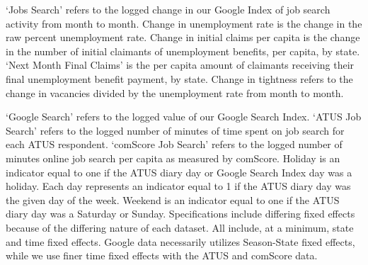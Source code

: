\documentclass[11pt, final]{article}
\begin{document}
\begin{sidewaystable}
\begin{center}

\end{center}
\begin{tablenotes}
\item \footnotesize  `Jobs Search' refers to the logged change in our Google Index of job search activity from month to month. Change in unemployment rate is the change in the raw percent unemployment rate. Change in initial claims per capita is the change in the number of initial claimants of unemployment benefits, per capita, by state. `Next Month Final Claims' is the per capita amount of claimants receiving their final unemployment benefit payment, by state. Change in tightness refers to the change in vacancies divided by the unemployment rate from month to month.
\end{tablenotes}
\end{sidewaystable}

\begin{sidewaystable}
\begin{center}

\end{center}
\begin{tablenotes}
\item \footnotesize `Google Search' refers to the logged value of our Google Search Index. `ATUS Job Search' refers to the logged number of minutes of time spent on job search for each ATUS respondent. `comScore Job Search' refers to the logged number of minutes online job search per capita as measured by comScore. Holiday is an indicator equal to one if the ATUS diary day or Google Search Index day was a holiday. Each day represents an indicator equal to 1 if the ATUS diary day was the given day of the week. Weekend is an indicator equal to one if the ATUS diary day was a Saturday or Sunday. Specifications include differing fixed effects because of the differing nature of each dataset. All include, at a minimum, state and time fixed effects. Google data necessarily utilizes Season-State fixed effects, while we use finer time fixed effects with the ATUS and comScore data.
\end{tablenotes}
\end{sidewaystable}
\end{document}
